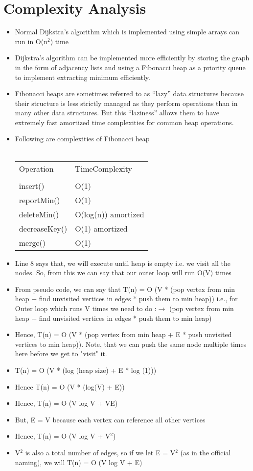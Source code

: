 \documentclass{article}
\begin{document}
\section{Complexity Analysis}
\begin{itemize}
\item	Normal Dijkstra’s algorithm which is implemented using simple arrays can run in O(n$^{2}$) time
\item	Dijkstra's algorithm can be implemented more efficiently by storing the graph in the form of adjacency lists and using a Fibonacci heap as a priority queue to implement extracting minimum efficiently. 
\item	Fibonacci heaps are sometimes referred to as “lazy” data structures because their structure is less strictly managed as they perform operations than in many other data structures. But this “laziness” allows them to have extremely fast amortized time complexities for common heap operations.
\item	Following are complexities of Fibonacci heap\\\\
\begin{tabular}{ll}
Operation		&	TimeComplexity\\\\
insert()	&		O(1)\\
reportMin()	&		O(1)\\
deleteMin()	&		O(log(n)) amortized\\
decreaseKey()	&	O(1) amortized\\
merge()		&		O(1)\\
\end{tabular}
\item Line 8 says that, we will execute until heap is empty i.e. we visit all the nodes. So, from this we can say that our outer loop will run O(V) times
\item	From pseudo code, we can say that
T(n) = O (V * (pop vertex from min heap + find unvisited vertices in edges * push them to min heap)) 
{i.e., for Outer loop which runs V times we need to do :$\rightarrow$ (pop vertex from min heap + find unvisited vertices in edges * push them to min heap)}
\item	Hence, T(n) =   O (V * (pop vertex from min heap + E * push unvisited vertices to min heap)). 
Note, that we can push the same node multiple times here before we get to "visit" it.
\item	T(n) = O (V * (log (heap size) + E * log (1)))
\item	Hence T(n) = O (V * (log(V) + E))
\item	Hence, T(n) = O (V log V + VE)
\item	But, E = V because each vertex can reference all other vertices
\item	Hence, T(n) = O (V log V + V$^{2}$)
\item	V$^{2}$ is also a total number of edges, so if we let E = V$^{2}$ (as in the official naming), we will T(n) = O (V log V + E)


\end{itemize}
\end{document}
